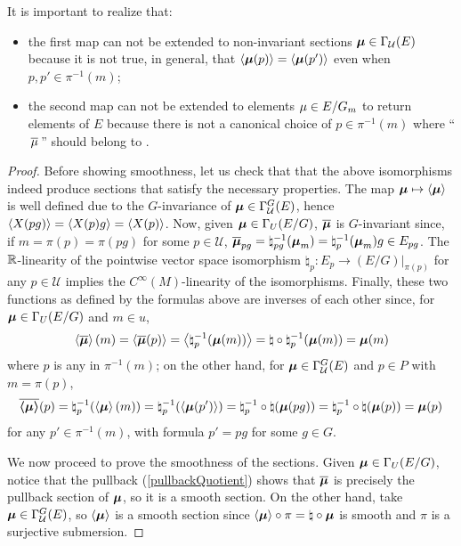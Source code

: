It is important to realize that:
\begin{itemize}
    \item the first map can not be extended to non-invariant sections $\bm{\mu} \in \Gamma_{\mathcal U}(E)$ because it is not true, in general, that $\left\langle \bm{\mu}(p) \right\rangle = \left\langle \bm{\mu}(p') \right\rangle$ even when $p, p' \in \pi^{-1}(m)$;
    
    \item the second map can not be extended to elements $\mathfrak{\mu} \in E/G_m$ to return elements of $E$ because there is not a canonical choice of $p \in \pi^{-1}(m)$ where ``$\,\overline{\mathfrak{\mu}}\,$'' should belong to .
\end{itemize}

\begin{proof}
Before showing smoothness, let us check that that the above isomorphisms indeed produce sections that satisfy the necessary properties.
The map $\bm{\mu} \mapsto \left\langle \bm{\mu} \right\rangle$ is well defined due to the $G$-invariance of $\bm{\mu} \in \Gamma^G_{\mathcal U}(E)$, hence $\left\langle X(pg) \right\rangle = \left\langle X(p)g \right\rangle = \left\langle X(p) \right\rangle$. 
Now, given $\bm{\mathfrak{\mu}} \in \Gamma_U(E/G)$, $\overline{\bm{\mathfrak{\mu}}}$ is $G$-invariant since, if $m = \pi(p) = \pi(pg)$ for some $p \in \mathcal U$, $\overline{\bm{\mathfrak{\mu}}}_{pg} = \natural^{-1}_{pg}(\bm{\mathfrak{\mu}}_{m}) = \natural^{-1}_{p}(\bm{\mathfrak{\mu}}_{m})g \in E_{pg}$. 
The $\mathbb{R}$-linearity of the pointwise vector space isomorphism $\natural_p:E_p \to (E/G)|_{\pi(p)}$ for any $p \in \mathcal U$ implies the $C^{\infty}(M)$-linearity of the isomorphisms.
Finally, these two functions as defined by the formulas above are inverses of each other since, 
for $\bm{\mathfrak{\mu}} \in \Gamma_U(E/G)$ and $m \in u$, 
\[\left\langle \overline{\bm{\mathfrak{\mu}}} \right\rangle(m) = \left\langle \overline{\bm{\mathfrak{\mu}}} (p) \right\rangle = \left\langle  \natural_p^{-1}(\bm{\mathfrak{\mu}}(m))  \right\rangle = \natural \circ \natural_p^{-1}(\bm{\mathfrak{\mu}}(m)) = \bm{\mathfrak{\mu}}(m)\] 
where $p$ is any in $\pi^{-1}(m)$; on the other hand,
for $\bm{\mu} \in \Gamma^G_{\mathcal U}(E)$ and $p \in P$ with $m = \pi(p)$, 
\[\overline{\bm{\left\langle \bm{\mu} \right\rangle}}(p) = \natural_p^{-1}(\left\langle \bm{\mu} \right\rangle(m)) = \natural_p^{-1}(\left\langle \bm{\mu}(p') \right\rangle) = \natural_p^{-1} \circ \natural (\bm{\mu}(pg)) = \natural_p^{-1} \circ \natural (\bm{\mu}(p)) = \bm{\mu}(p)\]
for any $p' \in \pi^{-1}(m)$, with formula $p' = pg$ for some $g\in G$.

We now proceed to prove the smoothness of the sections. Given $\bm{\mathfrak{\mu}} \in \Gamma_U(E/G)$, notice that the pullback (\ref{pullbackQuotient}) shows that $\overline{\bm{\mathfrak{\mu}}}$ is precisely the pullback section of $\bm{\mathfrak{\mu}}$, so it is a smooth section. On the other hand, take $\bm{\mu} \in \Gamma^G_{\mathcal U}(E)$, so $\left\langle \bm{\mu} \right\rangle$ is a smooth section since $\left\langle \bm{\mu} \right\rangle \circ \pi = \natural \circ \bm{\mu}$ is smooth and $\pi$ is a surjective submersion.

\end{proof}


